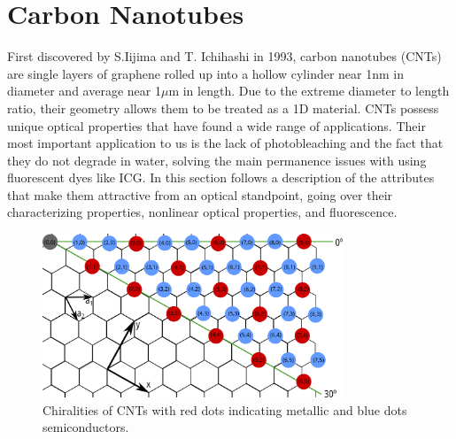 \chapter{Carbon Nanotubes}
First discovered by S.Iijima and T. Ichihashi in 1993, carbon nanotubes (CNTs) are single layers of graphene rolled up into a hollow cylinder near 1nm in diameter and average near 1$\mu$m in length. Due to the extreme diameter to length ratio, their geometry allows them to be treated as a 1D material. CNTs possess unique optical properties that have found a wide range of applications\cite{yamashita}. Their most important application to us is the lack of photobleaching and the fact that they do not degrade in water, solving the main permanence issues with using fluorescent dyes like ICG. In this section follows a description of the attributes that make them attractive from an optical standpoint, going over their characterizing properties, nonlinear optical properties, and fluorescence.
\begin{figure}[htb!]
	\centering
	\includegraphics[width=0.8\textwidth]{./Figures/CNTs/chiral.png}
	\caption{Chiralities of CNTs with red dots indicating metallic and blue dots semiconductors. }
	\label{fig:chiralities}
\end{figure}
